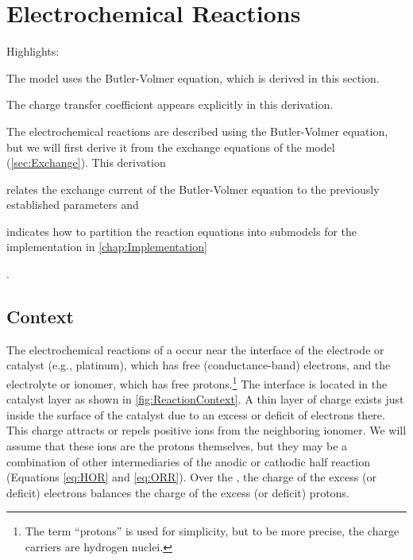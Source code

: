 \section{Electrochemical Reactions}
\label{sec:Reaction}



\begin{contextbox}%
  Highlights:
  \begin{itemize*}
    \item The model uses the Butler-Volmer equation, which is derived in this section.
    \item The charge transfer coefficient appears explicitly in this derivation.
  \end{itemize*}
\end{contextbox}

The electrochemical reactions are described using the Butler-Volmer equation, but we will first derive it from the exchange equations of the model (\autoref{sec:Exchange}).  This derivation \begin{inparaenum}[(1)]\item relates the exchange current of the Butler-Volmer equation to the previously established parameters and \item indicates how to partition the reaction equations into submodels for the implementation in \autoref{chap:Implementation}\end{inparaenum}.


\subsection{Context}

The electrochemical reactions of a  occur near the interface of the electrode or catalyst (e.g., platinum), which has free (conductance-band) electrons, and the electrolyte or ionomer, which has free protons.\footnote{ The term ``protons'' is used for simplicity, but to be more precise, the charge carriers are hydrogen nuclei.}  The interface is located in the catalyst layer as shown in \autoref{fig:ReactionContext}.  A thin layer of charge exists just inside the surface of the catalyst due to an excess or deficit of electrons there.  This charge attracts or repels positive ions from the neighboring ionomer.  We will assume that these ions are the protons themselves, but they may be a combination of other intermediaries of the anodic or cathodic half reaction (Equations \ref{eq:HOR} and \ref{eq:ORR}).  Over the , the charge of the excess (or deficit) electrons balances the charge of the excess (or deficit) protons.  

